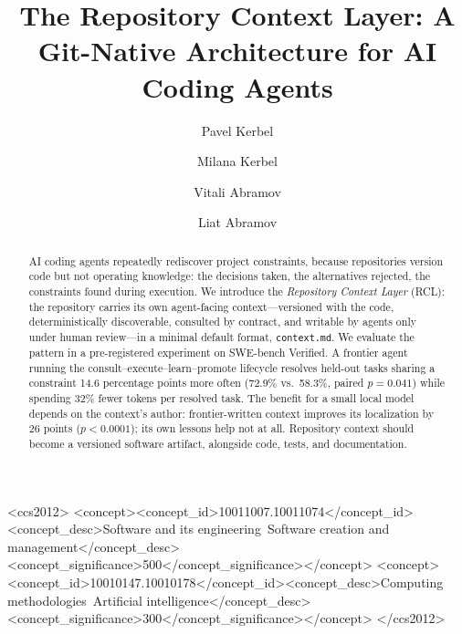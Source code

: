 \documentclass[sigconf,review]{acmart}
\newcommand{\ctx}{\texttt{context.md}}
\begin{document}
\title{The Repository Context Layer: A Git-Native Architecture for AI Coding Agents}

\author{Pavel Kerbel}
\author{Milana Kerbel}
\author{Vitali Abramov}
\author{Liat Abramov}

\begin{abstract}
AI coding agents repeatedly rediscover project constraints, because repositories version code but not operating knowledge: the decisions taken, the alternatives rejected, the constraints found during execution. We introduce the \emph{Repository Context Layer} (RCL): the repository carries its own agent-facing context---versioned with the code, deterministically discoverable, consulted by contract, and writable by agents only under human review---in a minimal default format, \ctx{}. We evaluate the pattern in a pre-registered experiment on SWE-bench Verified. A frontier agent running the consult--execute--learn--promote lifecycle resolves held-out tasks sharing a constraint 14.6 percentage points more often (72.9\% vs.\ 58.3\%, paired $p=0.041$) while spending 32\% fewer tokens per resolved task. The benefit for a small local model depends on the context's author: frontier-written context improves its localization by 26 points ($p<0.0001$); its own lessons help not at all. Repository context should become a versioned software artifact, alongside code, tests, and documentation.
\end{abstract}

\begin{CCSXML}
<ccs2012>
<concept><concept_id>10011007.10011074</concept_id><concept_desc>Software and its engineering~Software creation and management</concept_desc><concept_significance>500</concept_significance></concept>
<concept><concept_id>10010147.10010178</concept_id><concept_desc>Computing methodologies~Artificial intelligence</concept_desc><concept_significance>300</concept_significance></concept>
</ccs2012>
\end{CCSXML}
\end{document}
